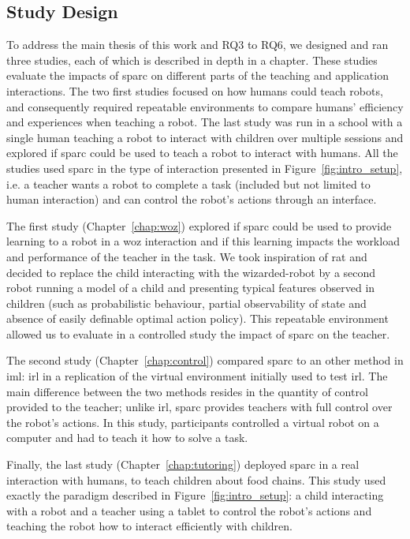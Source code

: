 \subsection{Study Design} 

To address the main thesis of this work and RQ3 to RQ6, we designed and ran three studies, each of which is described in depth in a chapter. These studies evaluate the impacts of \gls{sparc} on different parts of the teaching and application interactions. The two first studies focused on how humans could teach robots, and consequently required repeatable environments to compare humans' efficiency and experiences when teaching a robot. The last study was run in a school with a single human teaching a robot to interact with children over multiple sessions and explored if \gls{sparc} could be used to teach a robot to interact with humans. All the studies used \gls{sparc} in the type of interaction presented in Figure~\ref{fig:intro_setup}, i.e. a teacher wants a robot to complete a task (included but not limited to human interaction) and can control the robot's actions through an interface. 

The first study (Chapter~\ref{chap:woz}) explored if \gls{sparc} could be used to provide learning to a robot in a \gls{woz} interaction and if this learning impacts the workload and performance of the teacher in the task. We took inspiration of \gls{rat} and decided to replace the child interacting with the wizarded-robot by a second robot running a model of a child and presenting typical features observed in children (such as probabilistic behaviour, partial observability of state and absence of easily definable optimal action policy). This repeatable environment allowed us to evaluate in a controlled study the impact of \gls{sparc} on the teacher.

The second study (Chapter~\ref{chap:control}) compared \gls{sparc} to an other method in \gls{iml}: \gls{irl} in a replication of the virtual environment initially used to test \gls{irl}. The main difference between the two methods resides in the quantity of control provided to the teacher; unlike \gls{irl}, \gls{sparc} provides teachers with full control over the robot's actions. In this study, participants controlled a virtual robot on a computer and had to teach it how to solve a task.

Finally, the last study (Chapter~\ref{chap:tutoring}) deployed \gls{sparc} in a real interaction with humans, to teach children about food chains. This study used exactly the paradigm described in Figure~\ref{fig:intro_setup}: a child interacting with a robot and a teacher using a tablet to control the robot's actions and teaching the robot how to interact efficiently with children.

